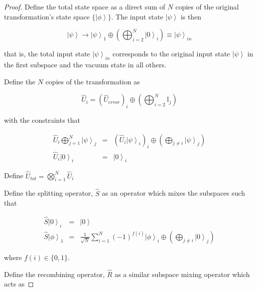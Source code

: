 \documentclass[aps,pra,twocolumn,superscriptaddress,numerical]{revtex4-1}
\begin{document}
	\begin{proof}
		
		Define the total state space as a direct sum of $N$ copies of the original transformation's state space $\{\left|\phi\right\rangle\}$. The input state $\left|\psi\right\rangle$ is then
		
		\begin{equation}
			\left|\psi\right\rangle\rightarrow\left|\psi\right\rangle_{1}\oplus\left(\bigoplus_{i=2}^{N}\left|0\right\rangle_{i}\right)\equiv\left|\psi\right\rangle_{in}
		\end{equation}
		
		that is, the total input state $\left|\psi\right\rangle_{in}$ corresponds to the original input state $\left|\psi\right\rangle$ in the first subspace and the vacuum state in all others.
		
		Define the $N$ copies of the transformation as
		
		\begin{equation}
			\hat{U}_{i}=\left(\hat{U}_{error}\right)_{i}\oplus\left(\bigoplus_{i=2}^{N}\mathbb{I}_{j}\right)
		\end{equation}
		
		with the constraints that
		
		\begin{eqnarray}
			\hat{U}_{i}\bigoplus_{j=1}^{N}\left|\psi\right\rangle_{j} &=& \left(\hat{U}_{i}\left|\psi\right\rangle_{i}\right)_{i}\oplus\left(\bigoplus_{j\ne i}\left|\psi\right\rangle_{j}\right)\\
			\hat{U}_{i}\left|0\right\rangle_{i}&=&\left|0\right\rangle_{i}
		\end{eqnarray}
		
		Define $\hat{U}_{tot}=\bigotimes_{i=1}^{N}\hat{U}_{i} $
		
		Define the splitting operator, $\hat{S}$ as an operator which mixes the subspaces such that
		
		\begin{eqnarray}
			\hat{S}\left|0\right\rangle_{i} &=& \left|0\right\rangle \\
			\hat{S}\left|\phi\right\rangle_{1} &=& \frac{1}{\sqrt{N}}\sum_{i=1}^{N}\left(-1\right)^{f\left(i\right)}\left|\phi\right\rangle_{i}\oplus\left(\bigoplus_{j\ne i}\left|0\right\rangle_{j}\right) 
		\end{eqnarray}
		
		where $f\left(i\right)\in\{0,1\}$.
		
		Define the recombining operator, $\hat{R}$ as a similar subspace mixing operator which acts as
		

\end{proof}
\end{document}
